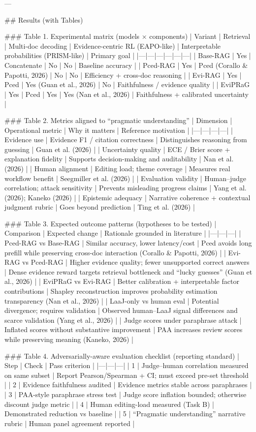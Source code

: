 ---

## Results (with Tables)  

### Table 1. Experimental matrix (models × components)
| Variant | Retrieval | Multi-doc decoding | Evidence-centric RL (EAPO-like) | Interpretable probabilities (PRISM-like) | Primary goal |
|---|---|---|---|---|---|
| Base-RAG | Yes | Concatenate | No | No | Baseline accuracy |
| Pced-RAG | Yes | Pced (Corallo & Papotti, 2026) | No | No | Efficiency + cross-doc reasoning |
| Evi-RAG | Yes | Pced | Yes (Guan et al., 2026) | No | Faithfulness / evidence quality |
| EviPRaG | Yes | Pced | Yes | Yes (Nan et al., 2026) | Faithfulness + calibrated uncertainty |

### Table 2. Metrics aligned to “pragmatic understanding”
| Dimension | Operational metric | Why it matters | Reference motivation |
|---|---|---|---|
| Evidence use | Evidence F1 / citation correctness | Distinguishes reasoning from guessing | Guan et al. (2026) |
| Uncertainty quality | ECE / Brier score + explanation fidelity | Supports decision-making and auditability | Nan et al. (2026) |
| Human alignment | Editing load; theme coverage | Measures real workflow benefit | Seegmiller et al. (2026) |
| Evaluation validity | Human–judge correlation; attack sensitivity | Prevents misleading progress claims | Yang et al. (2026); Kaneko (2026) |
| Epistemic adequacy | Narrative coherence + contextual judgment rubric | Goes beyond prediction | Ting et al. (2026) |

### Table 3. Expected outcome patterns (hypotheses to be tested)
| Comparison | Expected change | Rationale grounded in literature |
|---|---|---|
| Pced-RAG vs Base-RAG | Similar accuracy, lower latency/cost | Pced avoids long prefill while preserving cross-doc interaction (Corallo & Papotti, 2026) |
| Evi-RAG vs Pced-RAG | Higher evidence quality; fewer unsupported correct answers | Dense evidence reward targets retrieval bottleneck and “lucky guesses” (Guan et al., 2026) |
| EviPRaG vs Evi-RAG | Better calibration + interpretable factor contributions | Shapley reconstruction improves probability estimation transparency (Nan et al., 2026) |
| LaaJ-only vs human eval | Potential divergence; requires validation | Observed human–LaaJ signal differences and scarce validation (Yang et al., 2026) |
| Judge scores under paraphrase attack | Inflated scores without substantive improvement | PAA increases review scores while preserving meaning (Kaneko, 2026) |

### Table 4. Adversarially-aware evaluation checklist (reporting standard)
| Step | Check | Pass criterion |
|---|---|---|
| 1 | Judge–human correlation measured on same subset | Report Pearson/Spearman + CI; must exceed pre-set threshold |
| 2 | Evidence faithfulness audited | Evidence metrics stable across paraphrases |
| 3 | PAA-style paraphrase stress test | Judge score inflation bounded; otherwise discount judge metric |
| 4 | Human editing-load measured (Task B) | Demonstrated reduction vs baseline |
| 5 | “Pragmatic understanding” narrative rubric | Human panel agreement reported |

